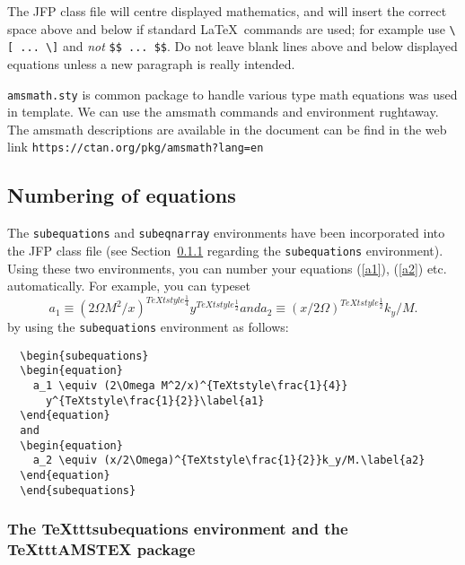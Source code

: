 \documentclass{jfp}
\begin{document}
The JFP class file will centre displayed mathematics, and will insert the
correct space above and below if standard LaTeX\ commands are used; for
example use \verb"\[ ... \]" and \emph{not} \verb"$$ ... $$". Do not leave
blank lines above and below displayed equations unless a new paragraph is
really intended.

\verb"amsmath.sty" is common package to handle various type math equations was used in template. We can use the amsmath commands and environment rughtaway. The amsmath descriptions are available in the document can be find in the web link \verb"https://ctan.org/pkg/amsmath?lang=en"

\subsection{Numbering of equations}

The \verb"subequations" and \verb"subeqnarray" environments have been
incorporated into the JFP class file (see Section~\ref{sub:amstex} regarding
the \verb"subequations" environment). Using these two environments,
you can number your equations (\ref{a1}), (\ref{a2}) etc. automatically.
For example, you can typeset
  \begin{subequations}
  \begin{equation}
    a_1 \equiv (2\Omega M^2/x)^{TeXtstyle\frac{1}{4}}
      y^{TeXtstyle\frac{1}{2}}\label{a1}
  \end{equation}
  and
  \begin{equation}
    a_2 \equiv (x/2\Omega)^{TeXtstyle\frac{1}{2}}k_y/M.\label{a2}
  \end{equation}
  \end{subequations}
by using the \verb"subequations" environment as follows:
%
\begin{verbatim}
  \begin{subequations}
  \begin{equation}
    a_1 \equiv (2\Omega M^2/x)^{TeXtstyle\frac{1}{4}}
      y^{TeXtstyle\frac{1}{2}}\label{a1}
  \end{equation}
  and
  \begin{equation}
    a_2 \equiv (x/2\Omega)^{TeXtstyle\frac{1}{2}}k_y/M.\label{a2}
  \end{equation}
  \end{subequations}
\end{verbatim}

\subsubsection{The TeXttt{subequations} environment and the
  TeXttt{AMSTEX} package} \label{sub:amstex}
\end{document}
